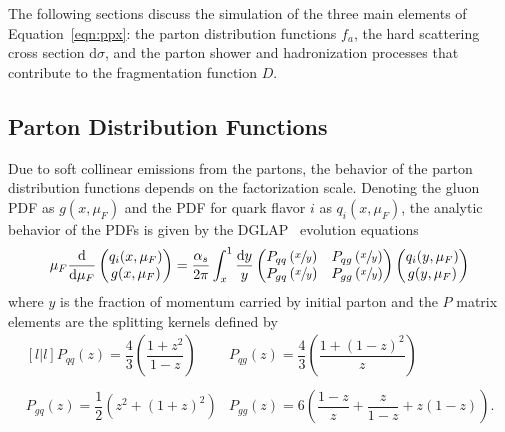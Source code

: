 The following sections discuss the simulation of the three main elements of Equation~\ref{eqn:ppx}: the parton distribution functions $f_a$, the hard scattering cross section $\text{d}\sigma$, and the parton shower and hadronization processes that contribute to the fragmentation function $D$.

\subsection{Parton Distribution Functions}

Due to soft collinear emissions from the partons, the behavior of the parton distribution functions depends on the factorization scale.
Denoting the gluon PDF as $g(x, \mu_F)$ and the PDF for quark flavor $i$ as $q_i(x, \mu_F)$, the analytic behavior of the PDFs is given by the DGLAP~\cite{Dokshitzer1977, Gribov1972, Altarelli1977} evolution equations
\begin{equation}
  \mu_F \frac{\text{d}}{\text{d} \mu_F} \begin{pmatrix} q_i(x, \mu_F) \\ g(x, \mu_F) \end{pmatrix}
  = \frac{\alpha_s}{2\pi} \int_{x}^{1} \frac{\text{d}y}{y}
  \begin{pmatrix}
     P_{qq}\left(\sfrac{x}{y}\right) &  P_{qg}\left(\sfrac{x}{y}\right) \\
     P_{gq}\left(\sfrac{x}{y}\right) &  P_{gg}\left(\sfrac{x}{y}\right) 
  \end{pmatrix}
    \begin{pmatrix} q_i(y, \mu_F) \\ g(y, \mu_F) \end{pmatrix}
\end{equation}
where $y$ is the fraction of momentum carried by initial parton and the $P$ matrix elements are the splitting kernels defined by
\begin{equation}
  \begin{matrix}[l | l]
    P_{qq}(z) = \dfrac{4}{3} \left( \dfrac{1+z^2}{1-z} \right)
    & P_{qg}(z) = \dfrac{4}{3} \left( \dfrac{1+(1-z)^2}{z} \right)
    \\ \\ P_{gq}(z) = \dfrac{1}{2} \left( z^2 + (1+z)^2 \right)
    & P_{gg}(z) = 6 \left( \dfrac{1-z}{z} + \dfrac{z}{1-z} + z(1-z) \right) .
  \end{matrix}
\end{equation}

